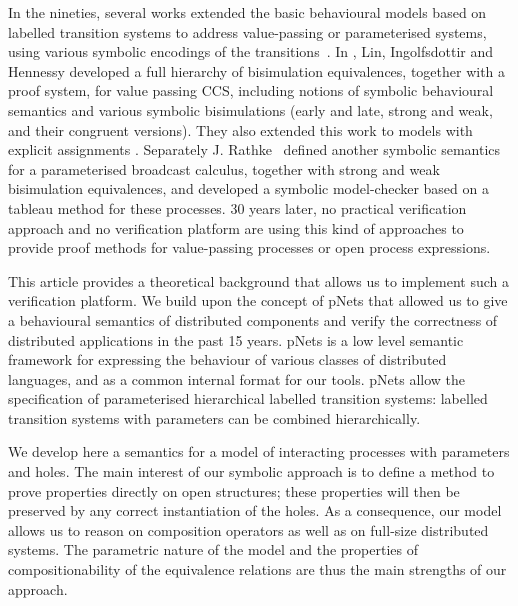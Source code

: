 \documentclass{lmcs}
\begin{document}
In the nineties, several 
works extended the basic behavioural models based on labelled
transition systems to address value-passing or parameterised systems, using
various symbolic encodings of the
transitions~\cite{deSimone85,Larsen87}. 
In \cite{IngolfsdottirL:2001,HennessyLin:TCS95}, Lin, Ingolfsdottir and Hennessy developed a full hierarchy of
bisimulation equivalences, together with a proof system, for value passing CCS,
including notions of symbolic behavioural semantics and various symbolic 
bisimulations (early and late, strong and weak, and their congruent versions). They also extended this work to models with explicit assignments \cite{Linconcur96}.
Separately J. Rathke~\cite{HennessyRathke:TCS98} defined another symbolic semantics for 
a parameterised broadcast calculus, together with strong and weak bisimulation
equivalences, and developed a symbolic model-checker based on a tableau
method for these processes. 30 years later, no
practical verification approach and no verification platform are
using this kind of approaches to provide proof methods for
value-passing processes or open process expressions. 


This article provides a theoretical background that allows us to implement such a verification 
platform. We build upon the concept of pNets that allowed us to give a behavioural semantics 
of distributed components and verify the correctness of distributed applications in the past 15 years. pNets  is a
low level semantic framework for expressing the behaviour of various
classes of distributed languages, and as a common internal format for
our tools.  pNets allow the
specification of parameterised hierarchical labelled
transition systems:  labelled transition systems with parameters can be
combined hierarchically.


We develop here a semantics for a model of interacting processes with parameters and holes. 
The main interest of our symbolic approach is to define a method to
prove properties directly on open structures; these properties will then be preserved
by any correct instantiation of the holes.
As a consequence, our model allows us to reason on composition
operators as well as on full-size distributed systems. The parametric
nature of the model and the properties of compositionability of the
equivalence relations are thus  the main
strengths of  our approach. 
\end{document}
